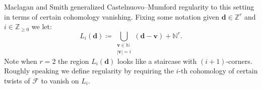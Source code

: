\documentclass[11pt,reqno]{amsart}
\theoremstyle{remark}
\newcommand{\dd}{\mathbf d}
\newcommand{\vv}{\mathbf v}
\newcommand{\cF}{\mathcal{F}}
\newcommand{\N}{\mathbb{N}}
\newcommand{\Z}{\mathbb{Z}}
\begin{document}
Maclagan and Smith generalized Castelnuovo--Mumford regularity to this setting in terms of certain cohomology vanishing. Fixing some notation given $\dd\in \Z^{r}$ and $i\in \Z_{\geq0}$ we let:
\[
L_{i}(\dd)\coloneqq \bigcup_{\substack{\vv \in \N \\ |\vv| = i}} (\dd-\vv)+\N^{r}.
\]
Note when $r=2$ the region $L_{i}(\dd)$ looks like a staircase with $(i+1)$-corners. Roughly speaking we define regularity by requiring the $i$-th cohomology of certain twists of $\cF$ to vanish on $L_{i}$. 

\end{document}
